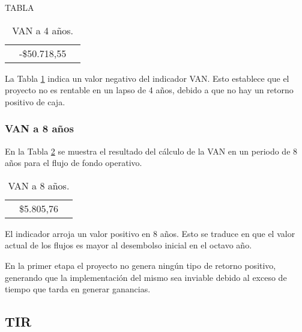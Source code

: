 TABLA
\begin{table}[H]
  \centering
    \begin{tabular}{|cc|r|}
    \rowcolor[rgb]{ .773,  .851,  .945} \multicolumn{3}{c}{\textbf{a 4 años}} \bigstrut[b]\\
    \hline
    \rowcolor[rgb]{ .773,  .851,  .945} \multicolumn{2}{|c|}{\textbf{VAN }} & \cellcolor[rgb]{ 1,  1,  1}\textcolor[rgb]{ 1,  0,  0}{-\$50.718,55} \bigstrut\\
    \hline
    \end{tabular}%
  \caption{VAN a 4 años.}  
  \label{tab:van-4}%
\end{table}%


La Tabla \ref{tab:van-4} indica un valor negativo del indicador VAN. Esto establece que el proyecto no es rentable en un lapso de 4 años, debido a que no hay un retorno positivo de caja. 

\subsubsection{VAN a 8 años}

En la Tabla \ref{tab:van-8} se muestra el resultado del cálculo de la VAN en un periodo de 8 años para el flujo de fondo operativo.

\begin{table}[H]
  \centering

    \begin{tabular}{|cc|r|}
    \rowcolor[rgb]{ .773,  .851,  .945} \multicolumn{3}{c}{\textbf{a 8 años}} \bigstrut[b]\\
    \hline
    \rowcolor[rgb]{ .773,  .851,  .945} \multicolumn{2}{|c|}{\textbf{VAN }} & \cellcolor[rgb]{ 1,  1,  1}\$5.805,76 \bigstrut\\
    \hline
    \end{tabular}%
  \caption{VAN a 8 años.}    
  \label{tab:van-8}%
\end{table}%


El indicador arroja un valor positivo en 8 años. Esto se traduce en que el valor actual de los flujos es mayor al desembolso inicial en el octavo año.

En la primer etapa el proyecto no genera ningún tipo de retorno positivo, generando que la implementación del mismo sea inviable debido al exceso de tiempo que tarda en generar ganancias.

\subsection{TIR}

